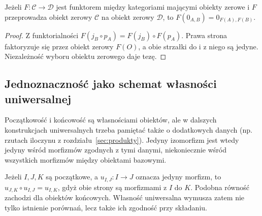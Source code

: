 \begin{stwierdzenie}\label{cat:prop:zero-functor}
Jeżeli $F:\mathcal C\to\mathcal D$ jest funktorem między kategoriami mającymi obiekty zerowe i $F$ przeprowadza obiekt zerowy $\mathcal C$ na obiekt zerowy $\mathcal D$, to $F(0_{A,B})=0_{F(A),F(B)}$.
\end{stwierdzenie}
\begin{proof}
Z funktorialności $F(j_B\circ p_A)=F(j_B)\circ F(p_A)$. Prawa strona faktoryzuje się przez obiekt zerowy $F(O)$, a obie strzałki do i z niego są jedyne. Niezależność wyboru obiektu zerowego daje tezę.
\end{proof}

\subsection{Jednoznaczność jako schemat własności uniwersalnej}

\begin{uwaga}\label{cat:rem:universal-coherence}
Początkowość i końcowość są własnościami obiektów, ale w dalszych konstrukcjach uniwersalnych trzeba pamiętać także o dodatkowych danych (np. rzutach iloczynu z rozdziału~\ref{sec:produkty}). Jedyny izomorfizm jest wtedy jedyny wśród morfizmów zgodnych z tymi danymi, niekoniecznie wśród wszystkich morfizmów między obiektami bazowymi.

Jeżeli $I,J,K$ są początkowe, a $u_{I,J}:I\to J$ oznacza jedyny morfizm, to $u_{J,K}\circ u_{I,J}=u_{I,K}$, gdyż obie strony są morfizmami z $I$ do $K$. Podobna równość zachodzi dla obiektów końcowych. Własność uniwersalna wymusza zatem nie tylko istnienie porównań, lecz także ich zgodność przy składaniu.
\end{uwaga}

